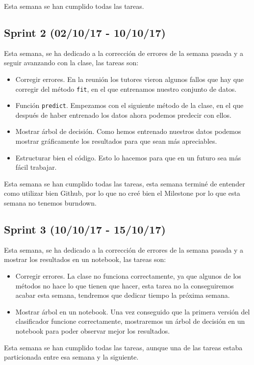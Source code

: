 Esta semana se han cumplido todas las tareas.

\subsection{Sprint 2 (02/10/17 - 10/10/17)}
Esta semana, se ha dedicado a la corrección de errores de la semana pasada y a seguir avanzando con la clase, las tareas son:
\begin{itemize}
\item Corregir errores. En la reunión los tutores vieron algunos fallos que hay que corregir del método \texttt{fit}, en el que entrenamos nuestro conjunto de datos.
\item Función \texttt{predict}. Empezamos con el siguiente método de la clase, en el que después de haber entrenado los datos ahora podemos predecir con ellos.
\item Mostrar árbol de decisión. Como hemos entrenado nuestros datos podemos mostrar gráficamente los resultados para que sean más apreciables.
\item Estructurar bien el código. Esto lo hacemos para que en un futuro sea más fácil trabajar.
\end{itemize}

Esta semana se han cumplido todas las tareas, esta semana terminé de entender como utilizar bien Github, por lo que no creé bien el Milestone por lo que esta semana no tenemos burndown.

\subsection{Sprint 3 (10/10/17 - 15/10/17)}
Esta semana, se ha dedicado a la corrección de errores de la semana pasada y a mostrar los resultados en un notebook, las tareas son:
\begin{itemize}
\item Corregir errores. La clase no funciona correctamente, ya que algunos de los métodos no hace lo que tienen que hacer, esta tarea no la conseguiremos acabar esta semana, tendremos que dedicar tiempo la próxima semana.
\item Mostrar árbol en un notebook. Una vez conseguido que la primera versión del clasificador funcione correctamente, mostraremos un árbol de decisión en un notebook para poder observar mejor los resultados.
\end{itemize}

Esta semana se han cumplido todas las tareas, aunque una de las tareas estaba particionada entre esa semana y la siguiente.

